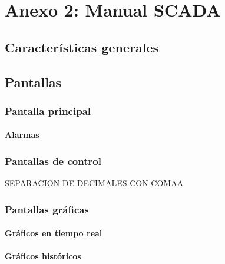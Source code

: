 


\section{Anexo 2: Manual SCADA}
\subsection{Características generales}
\subsection{Pantallas}
\subsubsection{Pantalla principal}
\paragraph{Alarmas}
\subsubsection{Pantallas de control}

SEPARACION DE DECIMALES CON COMAA
\subsubsection{Pantallas gráficas}
\paragraph{Gráficos en tiempo real}
\paragraph{Gráficos históricos}



\newpage